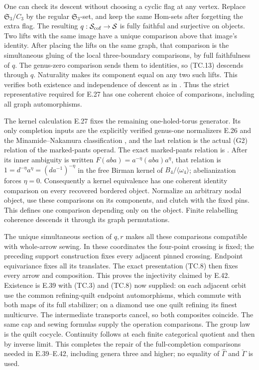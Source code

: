 One can check its descent without choosing a cyclic flag at any
vertex.  Replace $\mathfrak S_3/C_3$ by the regular
$\mathfrak S_3$-set, and keep the same Hom-sets after forgetting
the extra flag.  The resulting $q:\mathcal S_{\rm cof}\to\mathcal S$
is fully faithful and surjective on objects.  Two lifts with the
same image have a unique comparison above that image's identity.
After placing the lifts on the same graph, that comparison is the
simultaneous gluing of the local three-boundary comparisons, by
full faithfulness of $q$.  The genus-zero comparison sends them
to identities, so (TC.13) descends through $q$.  Naturality makes
its component equal on any two such lifts.  This verifies both
existence and independence of descent as in
\cite[Propositions~6.7 and 6.12]{ET_BonattoRobertson2026}.
Thus the strict representative required for E.27 has one coherent
choice of comparisons, including all graph automorphisms.

The kernel calculation E.27 fixes the remaining one-holed-torus generator.
Its only completion inputs are the explicitly verified genus-one
normalizers E.26 and the Minamide--Nakamura classification
\cite[Theorem~4.3(i), Corollary~C]{ET_MN2022}, and the
last relation is the actual (G2) relation of the marked-pants operad.
The exact marked-pants relation is
\cite[Theorem~3.18, relation (G2), and equations (6.3)--(6.5)]
{ET_BonattoRobertson2026}.  After its inner ambiguity is written
$F(aba)=a^{-\eta}(aba)a^\eta$, that relation is
$1=d^{-\eta}a^\eta=(da^{-1})^{-\eta}$ in the free Birman kernel of
$B_4/\langle\omega_4\rangle$; abelianization forces $\eta=0$.
Consequently a kernel equivalence has one coherent identity comparison
on every recovered bordered object.  Normalize an arbitrary nodal
object, use these comparisons on its components, and clutch with the
fixed pins.  This defines one comparison depending only on the object.
Finite relabelling coherence descends it through its graph permutations.

The unique simultaneous section of $q,r$ makes all these comparisons
compatible with whole-arrow sewing.  In these coordinates the
four-point crossing is fixed; the preceding support construction fixes
every adjacent pinned crossing.  Endpoint equivariance fixes all its
translates.  The exact presentation (TC.8) then fixes every arrow and
composition.  This proves the injectivity claimed by E.42.
Existence is E.39 with (TC.3) and (TC.8) now supplied: on each adjacent
orbit use the common refining-quilt endpoint automorphisms, which
commute with both maps of its full stabilizer; on a diamond use one
quilt refining its finest multicurve.  The intermediate transports
cancel, so both composites coincide.  The same cap and sewing formulas
supply the operation comparisons.  The group law is the quilt cocycle.
Continuity follows at each finite categorical quotient and then by
inverse limit.  This completes the repair of the full-completion
comparisons needed in E.39--E.42, including genera three and higher;
no equality of $\widehat\Gamma$ and $\check\Gamma$ is used.
